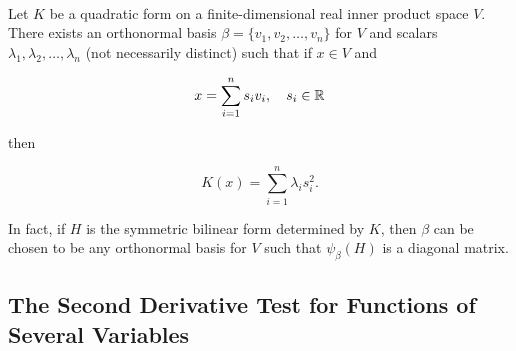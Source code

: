\begin{corollary}
	\hfill\\
	Let $K$ be a quadratic form on a finite-dimensional real inner product space $V$. There exists an orthonormal basis $\beta = \{v_1, v_2, \dots, v_n\}$ for $V$ and scalars $\lambda_1, \lambda_2, \dots, \lambda_n$ (not necessarily distinct) such that if $x \in V$ and

	\[x = \sum_{i=1}^{n}s_iv_i,\ \ \ s_i \in \mathbb{R}\]

	then

	\[K(x) = \sum_{i=1}^{n}\lambda_is_i^2.\]

	In fact, if $H$ is the symmetric bilinear form determined by $K$, then $\beta$ can be chosen to be any orthonormal basis for $V$ such that $\psi_\beta(H)$ is a diagonal matrix.
\end{corollary}

\subsection*{The Second Derivative Test for Functions of Several Variables}

